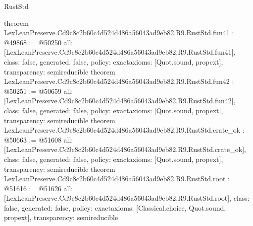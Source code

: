 \begin{lexlean}{RustStd}
\begin{coremodule}
{}
theorem LexLeanPreserve.Cd9c8c2b60c4d524d486a56043ad9eb82.R9.RustStd.fun41 : @49868 := @50250 {
  all: [LexLeanPreserve.Cd9c8c2b60c4d524d486a56043ad9eb82.R9.RustStd.fun41],
  class: false,
  generated: false,
  policy: exact{axioms: [Quot.sound, propext]},
  transparency: semireducible
}
theorem LexLeanPreserve.Cd9c8c2b60c4d524d486a56043ad9eb82.R9.RustStd.fun42 : @50251 := @50659 {
  all: [LexLeanPreserve.Cd9c8c2b60c4d524d486a56043ad9eb82.R9.RustStd.fun42],
  class: false,
  generated: false,
  policy: exact{axioms: [Quot.sound, propext]},
  transparency: semireducible
}
theorem LexLeanPreserve.Cd9c8c2b60c4d524d486a56043ad9eb82.R9.RustStd.crate_ok : @50663 := @51608 {
  all: [LexLeanPreserve.Cd9c8c2b60c4d524d486a56043ad9eb82.R9.RustStd.crate_ok],
  class: false,
  generated: false,
  policy: exact{axioms: [Quot.sound, propext]},
  transparency: semireducible
}
theorem LexLeanPreserve.Cd9c8c2b60c4d524d486a56043ad9eb82.R9.RustStd.root : @51616 := @51626 {
  all: [LexLeanPreserve.Cd9c8c2b60c4d524d486a56043ad9eb82.R9.RustStd.root],
  class: false,
  generated: false,
  policy: exact{axioms: [Classical.choice, Quot.sound, propext]},
  transparency: semireducible
}


\end{coremodule}
\end{lexlean}
